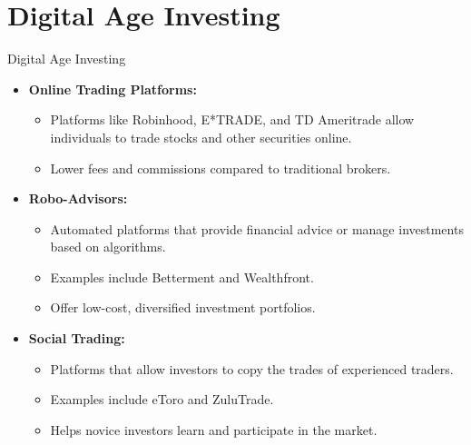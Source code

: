 \documentclass{beamer}
\begin{document}
\section{Digital Age Investing}
\begin{frame}{Digital Age Investing}
    \begin{itemize}
        \item \textbf{Online Trading Platforms:}
        \begin{itemize}
            \item Platforms like Robinhood, E*TRADE, and TD Ameritrade allow individuals to trade stocks and other securities online.
            \item Lower fees and commissions compared to traditional brokers.
        \end{itemize}
        \item \textbf{Robo-Advisors:}
        \begin{itemize}
            \item Automated platforms that provide financial advice or manage investments based on algorithms.
            \item Examples include Betterment and Wealthfront.
            \item Offer low-cost, diversified investment portfolios.
        \end{itemize}
        \item \textbf{Social Trading:}
        \begin{itemize}
            \item Platforms that allow investors to copy the trades of experienced traders.
            \item Examples include eToro and ZuluTrade.
            \item Helps novice investors learn and participate in the market.
        \end{itemize}
    \end{itemize}
\end{frame}
\end{document}
